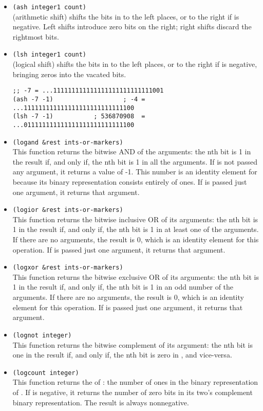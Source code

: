 \begin{itemize}[itemsep=10pt]
\item \lstinline|(ash integer1 count)|\\
   (arithmetic shift) shifts the bits in  to the left  places, or to the right if  is negative.
  Left shifts introduce zero bits on the right; right shifts discard the rightmost bits.
\item \lstinline|(lsh integer1 count)|\\
   (logical shift) shifts the bits in  to the left  places, or to the right if  is negative, bringing zeros into the vacated bits.
\begin{lstlisting}
;; -7 = ...111111111111111111111111111001
(ash -7 -1)                   ; -4 = ...111111111111111111111111111100
(lsh -7 -1)           ; 536870908  = ...011111111111111111111111111100
\end{lstlisting}
\item \lstinline|(logand &rest ints-or-markers)|\\
  This function returns the bitwise AND of the arguments: the nth bit is 1 in the result if, and only if, the nth bit is 1 in all the arguments.
  If  is not passed any argument, it returns a value of -1.
  This number is an identity element for  because its binary representation consists entirely of ones.
  If  is passed just one argument, it returns that argument.
\item \lstinline|(logior &rest ints-or-markers)|\\
  This function returns the bitwise inclusive OR of its arguments: the nth bit is 1 in the result if, and only if, the nth bit is 1 in at least one of the arguments.
  If there are no arguments, the result is 0, which is an identity element for this operation.
  If  is passed just one argument, it returns that argument.
\item \lstinline|(logxor &rest ints-or-markers)|\\
  This function returns the bitwise exclusive OR of its arguments: the nth bit is 1 in the result if, and only if, the nth bit is 1 in an odd number of the arguments.
  If there are no arguments, the result is 0, which is an identity element for this operation.
  If  is passed just one argument, it returns that argument.
\item \lstinline|(lognot integer)|\\
  This function returns the bitwise complement of its argument: the nth bit is one in the result if, and only if, the nth bit is zero in , and vice-versa. 
\item \lstinline|(logcount integer)|\\
  This function returns the  of : the number of ones in the binary representation of .
  If  is negative, it returns the number of zero bits in its two’s complement binary representation.
  The result is always nonnegative.
\end{itemize}


